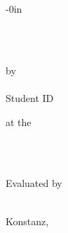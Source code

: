 \begin{titlepage}
\begin{adjustwidth*}{}{-0in}%
\centering

\textsc{\Large \MyType}\\[.9cm]

{ \huge \bfseries \MyTitle \\[.9cm] }


{\MySize
by\\
\MyAuthor\\
Student ID \MyStudentID \\[2.0cm]
}

{\MySize at the}


\MyFaculty \\
\MyDepartement \\[2.0cm]

{\MySize
\centering
    \item Evaluated by \MyCorrectorA
}%
\\
{\MySize Konstanz, \the\year}
\end{adjustwidth*}

\pagestyle{empty}



\end{titlepage}



